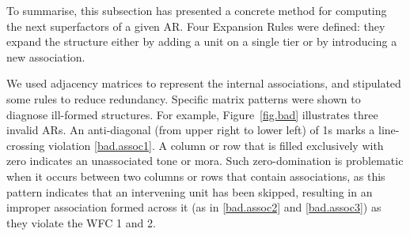 \documentclass{CUP-JNL-PHO}%
\theoremstyle{definition}
\numberwithin{equation}{section}
\theoremstyle{definition}
\begin{document}
To summarise, this subsection has presented a concrete method for
computing the next superfactors of a given AR. Four Expansion Rules
were defined: they expand the structure either by adding a unit on a
single tier or by introducing a new association.

We used adjacency matrices to represent the internal associations, and
stipulated some rules to reduce redundancy. Specific matrix patterns
were shown to diagnose ill-formed structures. For example,
Figure~\ref{fig.bad} illustrates three invalid ARs. An
anti-diagonal (from upper right to lower left) of 1s marks a
line-crossing violation \ref{bad.assoc1}. A column or
row that is filled exclusively with zero indicates an unassociated tone or mora. Such zero-domination is
problematic when it occurs between two columns or rows that contain
associations, as this pattern indicates that an intervening unit has
been skipped, resulting in an improper association formed across it
(as in \ref{bad.assoc2} and \ref{bad.assoc3}) as they violate the
WFC 1 and 2.
\end{document}
